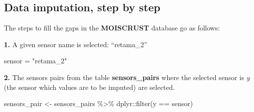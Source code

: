 \documentclass[
  table]{article}
\newenvironment{Shaded}{\begin{snugshade}}{\end{snugshade}}
\newcommand{\FunctionTok}[1]{\textcolor[rgb]{0.00,0.00,0.00}{#1}}
\newcommand{\NormalTok}[1]{#1}
\newcommand{\OtherTok}[1]{\textcolor[rgb]{0.56,0.35,0.01}{#1}}
\newcommand{\SpecialCharTok}[1]{\textcolor[rgb]{0.00,0.00,0.00}{#1}}
\newcommand{\StringTok}[1]{\textcolor[rgb]{0.31,0.60,0.02}{#1}}
\begin{document}
\hypertarget{data-imputation-step-by-step}{%
\subsection{Data imputation, step by
step}\label{data-imputation-step-by-step}}

The steps to fill the gaps in the \textbf{MOISCRUST} database go as
follows:

\textbf{1.} A given sensor name is selected: ``retama\_2''

\begin{Shaded}
\begin{Highlighting}[]
\NormalTok{sensor }\OtherTok{=} \StringTok{"retama\_2"}
\end{Highlighting}
\end{Shaded}

\textbf{2.} The sensors pairs from the table \textbf{sensors\_pairs}
where the selected sensor is \emph{y} (the sensor which values are to be
imputed) are selected.

\begin{Shaded}
\begin{Highlighting}[]
\NormalTok{sensors\_pair }\OtherTok{\textless{}{-}}\NormalTok{ sensors\_pairs }\SpecialCharTok{\%\textgreater{}\%} 
\NormalTok{    dplyr}\SpecialCharTok{::}\FunctionTok{filter}\NormalTok{(y }\SpecialCharTok{==}\NormalTok{ sensor)}
\end{Highlighting}
\end{Shaded}
\end{document}
